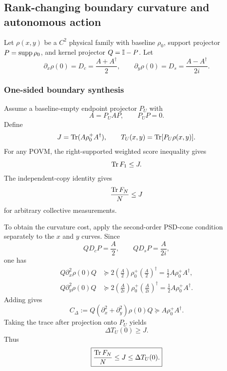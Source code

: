 
\subsection{Rank-changing boundary curvature and autonomous action}
\label{supp:boundary-action-full}

Let $\rho(x,y)$ be a $C^2$ physical family with baseline $\rho_0$, support projector $P=\operatorname{supp}\rho_0$, and kernel projector $Q=\mathbb I-P$. Let
\begin{equation}
\partial_x\rho(0)=D_c=\frac{A+A^\dagger}{2},
\qquad
\partial_y\rho(0)=D_s=\frac{A-A^\dagger}{2i}.
\end{equation}

\subsubsection{One-sided boundary synthesis}

Assume a baseline-empty endpoint projector $P_U$ with
\begin{equation}
A=P_UAP,
\qquad
P_UP=0.
\end{equation}
Define
\begin{equation}
J=\operatorname{Tr}(A\rho_0^+A^\dagger),
\qquad
T_U(x,y)=\operatorname{Tr}[P_U\rho(x,y)].
\end{equation}
For any POVM, the right-supported weighted score inequality gives
\begin{equation}
\operatorname{Tr} F_1\le J.
\label{eq:boundary-score-one}
\end{equation}
The independent-copy identity gives
\begin{equation}
\frac{\operatorname{Tr} F_N}{N}\le J
\label{eq:boundary-score-N}
\end{equation}
for arbitrary collective measurements.

To obtain the curvature cost, apply the second-order PSD-cone condition separately to the $x$ and $y$ curves. Since
\begin{equation}
QD_cP=\frac A2,
\qquad
QD_sP=\frac A{2i},
\end{equation}
one has
\begin{align}
Q\partial_x^2\rho(0)Q
&\succeq
2\left(\frac A2\right)\rho_0^+
\left(\frac A2\right)^\dagger
=\frac12A\rho_0^+A^\dagger,\\
Q\partial_y^2\rho(0)Q
&\succeq
2\left(\frac A{2i}\right)\rho_0^+
\left(\frac A{2i}\right)^\dagger
=\frac12A\rho_0^+A^\dagger.
\end{align}
Adding gives
\begin{equation}
C_\Delta
:=Q(\partial_x^2+\partial_y^2)\rho(0)Q
\succeq A\rho_0^+A^\dagger.
\label{eq:one-side-Cdelta}
\end{equation}
Taking the trace after projection onto $P_U$ yields
\begin{equation}
\Delta T_U(0)
\ge J.
\end{equation}
Thus
\begin{equation}
\boxed{
\frac{\operatorname{Tr} F_N}{N}\le J\le\Delta T_U(0).
}
\label{eq:one-side-final}
\end{equation}

